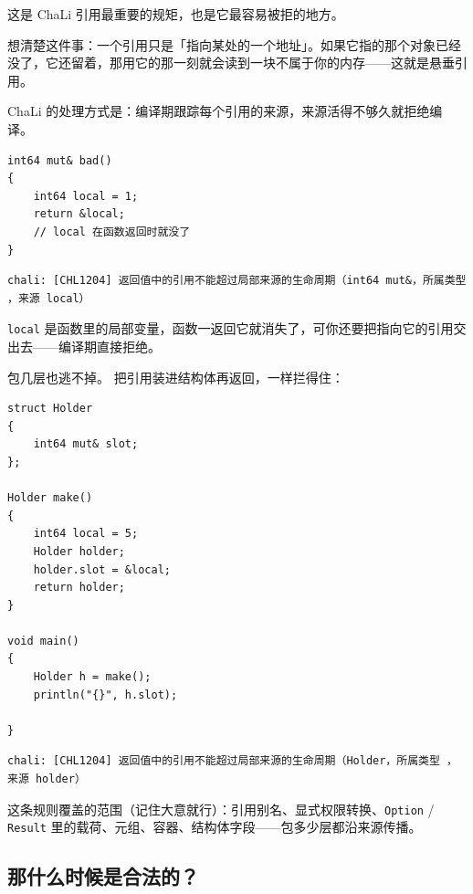 这是 ChaLi 引用最重要的规矩，也是它最容易被拒的地方。

想清楚这件事：一个引用只是「指向某处的一个地址」。如果它指的那个对象已经没了，它还留着，那用它的那一刻就会读到一块不属于你的内存——这就是悬垂引用。

ChaLi 的处理方式是：编译期跟踪每个引用的来源，来源活得不够久就拒绝编译。

\par
\medskip
\begin{lstlisting}[style=chali]
int64 mut& bad()
{
    int64 local = 1;
    return &local;
    // local 在函数返回时就没了
}
\end{lstlisting}
\par
\medskip

\par
\medskip
\begin{lstlisting}[style=out]
chali: [CHL1204] 返回值中的引用不能超过局部来源的生命周期（int64 mut&，所属类型 ，来源 local）
\end{lstlisting}
\par
\medskip

\texttt{local} 是函数里的局部变量，函数一返回它就消失了，可你还要把指向它的引用交出去——编译期直接拒绝。

包几层也逃不掉。 把引用装进结构体再返回，一样拦得住：

\par
\medskip
\begin{lstlisting}[style=chali]
struct Holder
{
    int64 mut& slot;
};

Holder make()
{
    int64 local = 5;
    Holder holder;
    holder.slot = &local;
    return holder;
}

void main()
{
    Holder h = make();
    println("{}", h.slot);

}
\end{lstlisting}
\par
\medskip

\par
\medskip
\begin{lstlisting}[style=out]
chali: [CHL1204] 返回值中的引用不能超过局部来源的生命周期（Holder，所属类型 ，来源 holder）
\end{lstlisting}
\par
\medskip

这条规则覆盖的范围（记住大意就行）：引用别名、显式权限转换、\texttt{Option} / \texttt{Result} 里的载荷、元组、容器、结构体字段——包多少层都沿来源传播。

\subsection*{那什么时候是合法的？}

